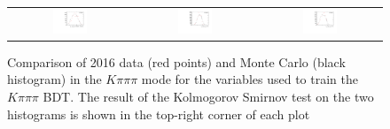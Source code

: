 \begin{figure}
\begin{tabular}{ccc}
\includegraphics[width=0.3\textwidth]{ANA_resources/Plots/Monte_carlo/data_vs_MC/Kpipipi/log10(KstarPi_IPCHI2_OWNPV)_2016.pdf} & \includegraphics[width=0.3\textwidth]{ANA_resources/Plots/Monte_carlo/data_vs_MC/Kpipipi/log10(KstarK_PT)_2016.pdf} & \includegraphics[width=0.3\textwidth]{ANA_resources/Plots/Monte_carlo/data_vs_MC/Kpipipi/log10(KstarPi_PT)_2016.pdf} \\
\end{tabular}
\caption{Comparison of 2016 data (red points) and Monte Carlo (black histogram) in the $K\pi\pi\pi$ mode for the variables used to train the $K\pi\pi\pi$ BDT. The result of the Kolmogorov Smirnov test on the two histograms is shown in the top-right corner of each plot}
\label{fig:data_vs_MC_Kpipipi_2016}
\end{figure}
